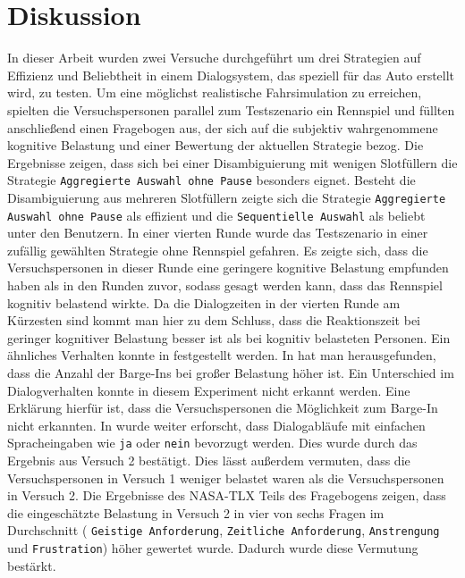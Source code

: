 \documentclass[12pt,a4paper]{scrartcl}
\begin{document}
\section{Diskussion}
\label{discussion}
In dieser Arbeit wurden zwei Versuche durchgeführt um drei Strategien auf Effizienz und Beliebtheit in einem Dialogsystem, das speziell für das Auto erstellt wird, zu testen. Um eine möglichst realistische Fahrsimulation zu erreichen, spielten die Versuchspersonen parallel zum Testszenario ein Rennspiel und füllten anschließend einen Fragebogen aus, der sich auf die subjektiv wahrgenommene kognitive Belastung und einer Bewertung der aktuellen Strategie bezog.
Die Ergebnisse zeigen, dass sich bei einer Disambiguierung mit wenigen Slotfüllern die Strategie \texttt{Aggregierte Auswahl ohne Pause} besonders eignet. Besteht die Disambiguierung aus mehreren Slotfüllern zeigte sich die Strategie \texttt{Aggregierte Auswahl ohne Pause} als effizient und die \texttt{Sequentielle Auswahl} als beliebt unter den Benutzern. \newline \newline
In einer vierten Runde wurde das Testszenario in einer zufällig gewählten Strategie ohne Rennspiel gefahren. Es zeigte sich, dass die Versuchspersonen in dieser Runde eine geringere kognitive Belastung empfunden haben als in den Runden zuvor, sodass gesagt werden kann, dass das Rennspiel kognitiv belastend wirkte. Da die Dialogzeiten in der vierten Runde am Kürzesten sind kommt man hier zu dem Schluss, dass die Reaktionszeit bei geringer kognitiver Belastung besser ist als bei kognitiv belasteten Personen. Ein ähnliches Verhalten konnte in \cite{DbCL} festgestellt werden. In \cite{eCLDS} hat man herausgefunden, dass die Anzahl der Barge-Ins bei großer Belastung höher ist. Ein Unterschied im Dialogverhalten konnte in diesem Experiment nicht erkannt werden. Eine Erklärung hierfür ist, dass die Versuchspersonen die Möglichkeit zum Barge-In nicht erkannten. In \cite{eCLDS} wurde weiter erforscht, dass Dialogabläufe mit einfachen Spracheingaben wie \texttt{ja} oder \texttt{nein} bevorzugt werden. Dies wurde durch das Ergebnis aus Versuch 2 bestätigt. Dies lässt außerdem vermuten, dass die Versuchspersonen in Versuch 1 weniger belastet waren als die Versuchspersonen in Versuch 2. Die Ergebnisse des NASA-TLX Teils des Fragebogens zeigen, dass die eingeschätzte Belastung in Versuch 2 in vier von sechs Fragen im Durchschnitt ( \texttt{Geistige Anforderung}, \texttt{Zeitliche Anforderung}, \texttt{Anstrengung} und \texttt{Frustration}) höher gewertet wurde. Dadurch wurde diese Vermutung bestärkt. \newline \newline
\end{document}

